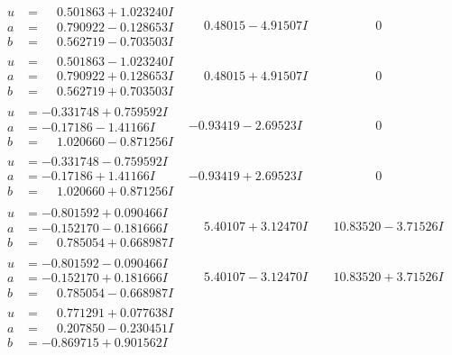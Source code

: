 \documentclass[1p]{elsarticle_modified}
\theoremstyle{definition}
\begin{document}
$$\begin{array}{c|c|c}
\begin{aligned}
u &= \phantom{-}0.501863 + 1.023240 I \\
a &= \phantom{-}0.790922 - 0.128653 I \\
b &= \phantom{-}0.562719 - 0.703503 I\end{aligned}
 & \phantom{-}0.48015 - 4.91507 I & \phantom{-0.000000 } 0 \\ \hline\begin{aligned}
u &= \phantom{-}0.501863 - 1.023240 I \\
a &= \phantom{-}0.790922 + 0.128653 I \\
b &= \phantom{-}0.562719 + 0.703503 I\end{aligned}
 & \phantom{-}0.48015 + 4.91507 I & \phantom{-0.000000 } 0 \\ \hline\begin{aligned}
u &= -0.331748 + 0.759592 I \\
a &= -0.17186 - 1.41166 I \\
b &= \phantom{-}1.020660 - 0.871256 I\end{aligned}
 & -0.93419 - 2.69523 I & \phantom{-0.000000 } 0 \\ \hline\begin{aligned}
u &= -0.331748 - 0.759592 I \\
a &= -0.17186 + 1.41166 I \\
b &= \phantom{-}1.020660 + 0.871256 I\end{aligned}
 & -0.93419 + 2.69523 I & \phantom{-0.000000 } 0 \\ \hline\begin{aligned}
u &= -0.801592 + 0.090466 I \\
a &= -0.152170 - 0.181666 I \\
b &= \phantom{-}0.785054 + 0.668987 I\end{aligned}
 & \phantom{-}5.40107 + 3.12470 I & \phantom{-}10.83520 - 3.71526 I \\ \hline\begin{aligned}
u &= -0.801592 - 0.090466 I \\
a &= -0.152170 + 0.181666 I \\
b &= \phantom{-}0.785054 - 0.668987 I\end{aligned}
 & \phantom{-}5.40107 - 3.12470 I & \phantom{-}10.83520 + 3.71526 I \\ \hline\begin{aligned}
u &= \phantom{-}0.771291 + 0.077638 I \\
a &= \phantom{-}0.207850 - 0.230451 I \\
b &= -0.869715 + 0.901562 I\end{aligned}

\end{array}$$
\end{document}
